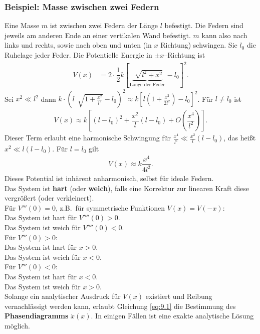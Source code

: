 \documentclass[a4paper,12pt]{article}
\numberwithin{equation}{section}
\begin{document}
\subsubsection{Beispiel: Masse zwischen zwei Federn}
Eine Masse $m$ ist zwischen zwei Federn der Länge $l$ befestigt. Die Federn sind jeweils am anderen Ende an einer vertikalen Wand befestigt. $m$ kann also nach links und rechts, sowie nach oben und unten (in $x$ Richtung) schwingen. Sie $l_0$ die Ruhelage jeder Feder. Die Potentielle Energie in $\pm x$--Richtung ist
\begin{align*} 
        V\left(x\right)&=2\cdot \dfrac{1}{2}k\left[\underbrace{\,\sqrt[]{l^2+x^2}}_{\,\text{Länge der Feder}\,}-l_0\right]^2
.\end{align*} 
Sei $x^2\ll l^2$ dann $k\cdot \left(l \,\sqrt[]{1+\tfrac{x^2}{l^2}}-l_0\right)^2\approx k\left[l\left(1+\tfrac{x^2}{2l^2}\right)-l_0\right]^2$. Für $l\neq l_0$ ist 
\begin{align*} 
        V\left(x\right)\approx k\left[\left(l-l_0\right)^2+\dfrac{x^2}{l}\left(l-l_0\right)+O\left(\dfrac{x^4}{l^2}\right)\right]
.\end{align*} 
Dieser Term erlaubt eine harmonische Schwingung für $\tfrac{x^4}{l^2}\ll \tfrac{x^2}{l}\left(l-l_0\right)$, das heißt $x^2\ll l\left(l-l_0\right)$. Für $l=l_0$ gilt
\begin{align*} 
        V\left(x\right)\approx k\dfrac{x^4}{4l^2}
.\end{align*} 
Dieses Potential ist inhärent anharmonisch, selbst für ideale Federn.\\\indent
Das System ist \textbf{hart} (oder \textbf{weich}), falls eine Korrektur zur linearen Kraft diese vergrößert (oder verkleinert).\\
Für $V'''\left(0\right)=0$, z.B.\ für symmetrische Funktionen $V\left(x\right)=V\left(-x\right)$:\\\indent
Das System ist hart für $V''''\left(0\right)>0$.\\\indent
Das System ist weich für $V''''\left(0\right)<0$.\\
Für $V'''\left(0\right)>0$:\\\indent
Das System ist hart für $x>0$.\\\indent
Das System ist weich für $x<0$.\\
Für $V'''\left(0\right)<0$:\\\indent
Das System ist hart für $x<0$.\\\indent
Das System ist weich für $x>0$.\\
Solange ein analytischer Ausdruck für $V\left(x\right)$ existiert und Reibung vernachlässigt werden kann, erlaubt Gleichung \eqref{eq:9.1} die Bestimmung des \textbf{Phasendiagramms} $\dot{x}\left(x\right)$. In einigen Fällen ist eine exakte \glqq analytische\grqq{} Lösung möglich.
\end{document}
